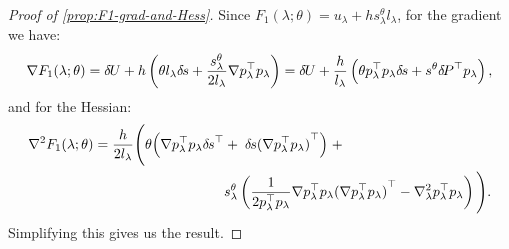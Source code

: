 \documentclass{article}
\begin{document}
\begin{proof}[Proof of \cref{prop:F1-grad-and-Hess}]
  Since $F_1(\lambda; \theta) = u_\lambda + h s^{\theta}_\lambda l_\lambda$, for the gradient we have:
  \begin{equation*}
    \nabla F_1(\lambda; \theta) = {\delta \hspace{-0.09em} U} + h \left(\theta l_\lambda {\delta \hspace{-0.1em} s} + \frac{s^{\theta}_\lambda}{2l_\lambda} \nabla p_\lambda^\top p_\lambda\right) = {\delta \hspace{-0.09em} U} + \frac{h}{l_\lambda} \left(\theta p_\lambda^\top p_\lambda {\delta \hspace{-0.1em} s} + s^{\theta} {\delta \hspace{-0.14em} P}^\top p_\lambda\right),
  \end{equation*}
  and for the Hessian:
  \begin{equation*}
    \begin{aligned}
      \nabla^2 F_1(\lambda; \theta) = \frac{h}{2 l_\lambda} \Bigg(\theta \Big(\nabla p_\lambda^\top p_\lambda {\delta \hspace{-0.1em} s}^\top &+\; {\delta \hspace{-0.1em} s} {(\nabla p_\lambda^\top p_\lambda)}^\top\Big) \;+ \\
      &s^{\theta}_\lambda \left(\frac{1}{2 p_\lambda^\top p_\lambda} \nabla p_\lambda^\top p_\lambda {(\nabla p_\lambda^\top p_\lambda)}^\top - \nabla^2_\lambda p_\lambda^\top p_\lambda\right) \Bigg).
    \end{aligned}
  \end{equation*}
  Simplifying this gives us the result.
\end{proof}
\end{document}
